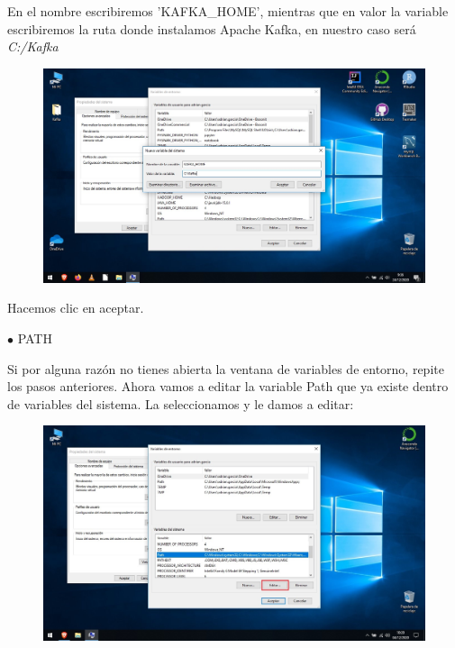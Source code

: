 \documentclass[a4paper,10pt]{article}
\begin{document}
\clearpage

En el nombre escribiremos 'KAFKA\_HOME', mientras que en valor la variable escribiremos la ruta donde instalamos Apache Kafka, en nuestro caso será \textit{C:/Kafka}

\begin{figure}[H]
\begin{center}
\includegraphics[width=450pt]{./fotos/Kafka/04.jpg}
\end{center}
\end{figure}

Hacemos clic en aceptar.

$\bullet$ PATH 

Si por alguna razón no tienes abierta la ventana de variables de entorno, repite los pasos anteriores. Ahora vamos a editar la variable Path que ya existe dentro de variables del sistema. La seleccionamos y le damos a editar:

\begin{figure}[H]
\begin{center}
\includegraphics[width=450pt]{./fotos/introduccion/12 - Java (V).jpg}
\end{center}
\end{figure}
\end{document}
